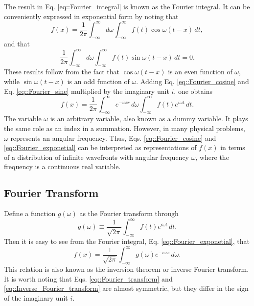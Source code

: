 \documentclass[a4paper]{article}
\begin{document}
The result in Eq. \ref{eq::Fourier_integral} is known as the Fourier integral. It can be conveniently expressed in exponential form by noting that
\begin{equation}\label{eq::Fourier_cosine}
f(x)=\frac{1}{2\pi}\int_{-\infty}^{\infty}d\omega \int_{-\infty}^\infty f(t) \cos\omega(t-x)\, dt,
\end{equation}
and that
\begin{equation}\label{eq::Fourier_sine}
\frac{1}{2\pi}\int_{-\infty}^\infty d\omega \int_{-\infty}^\infty f(t) \sin\omega(t-x)\, dt=0.
\end{equation}
These results follow from the fact that $\cos \omega(t-x)$ is an even function of $\omega$, while $\sin\omega(t-x)$ is an odd function of $\omega$. Adding Eq. \ref{eq::Fourier_cosine} and Eq. \ref{eq::Fourier_sine} multiplied by the imaginary unit $i$, one obtains
\begin{equation}\label{eq::Fourier_exponetial}
f(x)=\frac{1}{2\pi}\int_{-\infty}^\infty e^{-i \omega x }\,d\omega \int_{-\infty}^\infty f(t)e^{i\omega t}\,dt.
\end{equation}
The variable $\omega$ is an arbitrary variable, also known as a dummy variable. It plays the same role as an index in a summation. However, in many physical problems, $\omega$ represents an angular frequency. Thus, Eqs. \ref{eq::Fourier_cosine} and \ref{eq::Fourier_exponetial} can be interpreted as representations of $f(x)$ in terms of a distribution of infinite wavefronts with angular frequency $\omega$, where the frequency is a continuous real variable.

\subsection{Fourier Transform}
Define a function $g(\omega)$ as the Fourier transform through
\begin{equation}\label{eq::Fourier_transform}
g(\omega)\equiv \frac{1}{\sqrt{2\pi}}\int_{-\infty}^\infty f(t) e ^{i\omega t }\, dt.
\end{equation}
Then it is easy to see from the Fourier integral, Eq. \ref{eq::Fourier_exponetial}, that
\begin{equation}\label{eq::Inverse_Fourier_transform}
f(x)=\frac{1}{\sqrt{2\pi}}\int_{-\infty}^\infty g(\omega)e^{-i \omega x}\, d\omega.
\end{equation}
This relation is also known as the inversion theorem or inverse Fourier transform. It is worth noting that Eqs. \ref{eq::Fourier_transform} and \ref{eq::Inverse_Fourier_transform} are almost symmetric, but they differ in the sign of the imaginary unit $i$.
\end{document}
